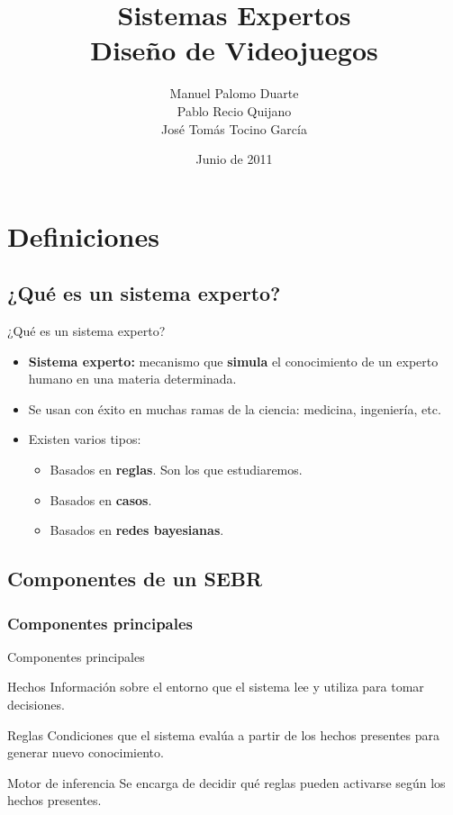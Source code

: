 \documentclass[smaller,spanish,xcolor=svgnames]{beamer}
\title[Sistemas Expertos]{{\Huge Sistemas Expertos} \\ Diseño de Videojuegos}
\author[Manuel Palomo Duarte - Pablo Recio Quijano - José Tomás Tocino]{Manuel Palomo Duarte \\ Pablo Recio Quijano \\ José Tomás Tocino García}
\date{Junio de 2011}
\begin{document}
\begin{frame}
  \titlepage
\end{frame}

\section{Definiciones}
\subsection{¿Qué es un sistema experto?}
\begin{frame}{¿Qué es un sistema experto?}
  \begin{itemize}
  \item \textbf{Sistema experto:} mecanismo que \textbf{simula} el
    conocimiento de un experto humano en una materia determinada.
  \item Se usan con éxito en muchas ramas de la ciencia: medicina, ingeniería, etc.
  \item Existen varios tipos:
    \begin{itemize}
    \item Basados en \textbf{reglas}. Son los que estudiaremos.
    \item Basados en \textbf{casos}.
    \item Basados en \textbf{redes bayesianas}.
    \end{itemize}
  \end{itemize}
\end{frame}

\subsection{Componentes de un SEBR}
\subsubsection{Componentes principales}

\begin{frame}{Componentes principales}
  \begin{block}{Hechos}
    Información sobre el entorno que el sistema lee y utiliza para tomar
    decisiones.
  \end{block}

  \begin{block}{Reglas}
    Condiciones que el sistema evalúa a partir de los hechos presentes para
    generar nuevo conocimiento.
  \end{block}

  \begin{block}{Motor de inferencia}
    Se encarga de decidir qué reglas pueden activarse según los hechos presentes.
  \end{block}
  
\end{frame}
\end{document}
